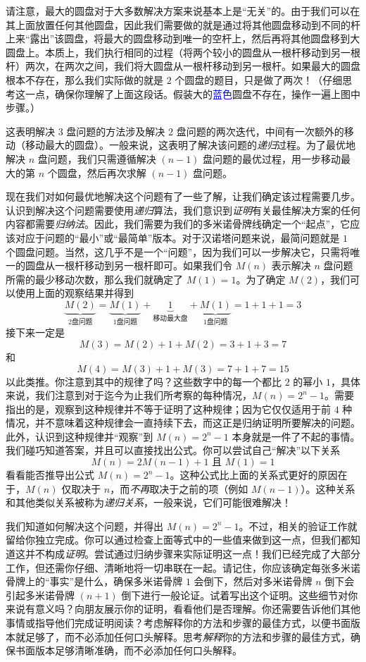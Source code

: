 请注意，最大的圆盘对于大多数解决方案来说基本上是``无关''的。由于我们可以在其上面放置任何其他圆盘，因此我们需要做的就是通过将其他圆盘移动到不同的杆上来``露出''该圆盘，将最大的圆盘移动到唯一的空杆上，然后再将其他圆盘移到大圆盘上。本质上，我们执行相同的过程（将两个较小的圆盘从一根杆移动到另一根杆）两次，在两次之间，我们将大圆盘从一根杆移动到另一根杆。如果最大的圆盘根本不存在，那么我们实际做的就是 $2$ 个圆盘的题目，只是做了两次！（仔细思考这一点，确保你理解了上面这段话。假装大的\textcolor{blue}{蓝色}圆盘不存在，操作一遍上图中步骤。）

这表明解决 $3$ 盘问题的方法涉及解决 $2$ 盘问题的两次迭代，中间有一次额外的移动（移动最大的圆盘）。一般来说，这表明了解决该问题的\emph{递归}过程。为了最优地解决 $n$ 盘问题，我们只需遵循解决 $(n - 1)$ 盘问题的最优过程，用一步移动最大的第 $n$ 个圆盘，然后再次求解 $(n - 1)$ 盘问题。

现在我们对如何最优地解决这个问题有了一些了解，让我们确定该过程需要几步。认识到解决这个问题需要使用\emph{递归}算法，我们意识到\emph{证明}有关最佳解决方案的任何内容都需要\emph{归纳法}。因此，我们需要为我们的多米诺骨牌线确定一个``起点''，它应该对应于问题的``最小''或``最简单''版本。对于汉诺塔问题来说，最简问题就是 $1$ 个圆盘问题。当然，这几乎不是一个``问题''，因为我们可以一步解决它，只需将唯一的圆盘从一根杆移动到另一根杆即可。如果我们令 $M(n)$ 表示解决 $n$ 盘问题所需的最少移动次数，那么我们就确定了 $M(1) = 1$。为了确定 $M(2)$，我们可以使用上面的观察结果并得到
\[\underbrace{M(2)}_{2 \text{盘问题}}= \underbrace{M(1)}_{1 \text{盘问题}}+ \underbrace{1}_{\text{移动最大盘}}+ \underbrace{M(1)}_{1 \text{盘问题}}= 1 + 1 + 1 = 3\]
接下来一定是
\[M(3) = M(2) + 1 + M(2) = 3 + 1 + 3 = 7\]
和
\[M(4) = M(3) + 1 + M(3) = 7 + 1 + 7 = 15\]
以此类推。你注意到其中的规律了吗？这些数字中的每一个都比 $2$ 的幂小 $1$，具体来说，我们注意到对于迄今为止我们所考察的每种情况，$M(n) = 2^n - 1$。需要指出的是，观察到这种规律并不等于证明了这种规律；因为它仅仅适用于前 $4$ 种情况，并不意味着这种规律会一直持续下去，而这正是归纳证明所要解决的问题。此外，认识到这种规律并``观察''到 $M(n) = 2^n - 1$ 本身就是一件了不起的事情。我们碰巧知道答案，并且可以直接找出公式。你可以尝试自己``解决''以下关系
\[M(n) = 2M(n - 1) + 1 \text{ 且 } M(1) = 1\]
看看能否推导出公式 $M(n) = 2^n -1$。这种公式比上面的关系式更好的原因在于，$M(n)$ 仅取决于 $n$，而\emph{不再}取决于之前的项（例如 $M(n-1)$）。这种关系和其他类似关系被称为\emph{递归关系}，一般来说，它们可能很难解决！

我们知道如何解决这个问题，并得出 $M(n) = 2^n - 1$。不过，相关的验证工作就留给你独立完成。你可以通过检查上面等式中的一些值来做到这一点，但我们都知道这并不构成\emph{证明}。尝试通过归纳步骤来实际证明这一点！我们已经完成了大部分工作，但还需你仔细、清晰地将一切串联在一起。请记住，你应该确定每张多米诺骨牌上的``事实''是什么，确保多米诺骨牌 $1$ 会倒下，然后对多米诺骨牌 $n$ 倒下会引起多米诺骨牌 $(n+1)$ 倒下进行一般论证。试着写出这个证明。这些细节对你来说有意义吗？向朋友展示你的证明，看看他们是否理解。你还需要告诉他们其他事情或指导他们完成证明阅读？考虑解释你的方法和步骤的最佳方式，以便书面版本就足够了，而不必添加任何口头解释。思考\emph{解释}你的方法和步骤的最佳方式，确保书面版本足够清晰准确，而不必添加任何口头解释。 

